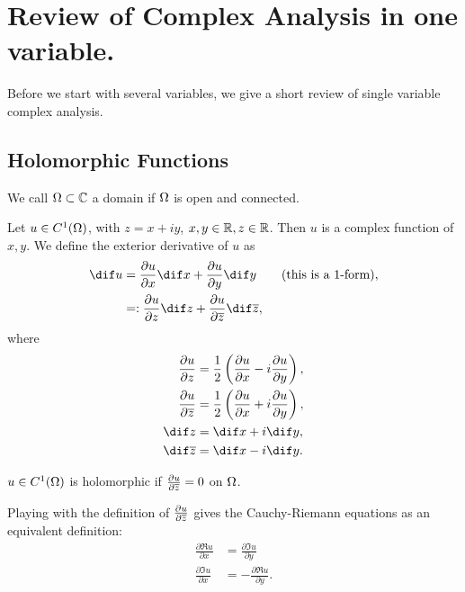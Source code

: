 \newpage
\section{Review of Complex Analysis in one variable.}

Before we start with several variables, we give a short review of single variable complex analysis.

\subsection{Holomorphic Functions}

\begin{definition}
    We call $\Omega \subset \mathbb{C}$ a domain if $\Omega$ is open and connected.
\end{definition}

\begin{definition}
    Let $u \in C^1 ( \Omega)$, with $z = x + i y$, $x,y \in \mathbb{R}, z \in \mathbb{R}$. Then $u $ is a complex function of $x ,y$. We define the exterior derivative of $u$ as
    \begin{align*}
        \dif u &= \frac{\partial u }{\partial x } \dif x + \frac{\partial u}{\partial y} \dif y \qquad \text{(this is a 1-form)}, \\
        &=: \frac{\partial u}{\partial z} \dif z + \frac{\partial u}{ \partial \ov{z} } \dif \ov{z},
    \end{align*}
    where
    \begin{align*}
        \frac{\partial u}{\partial z} &= \frac{1}{2} \br{\frac{\partial u}{\partial x} - i \frac{\partial u}{\partial y}},\\
        \frac{\partial u}{\partial \ov{z}} &= \frac{1}{2} \br{\frac{\partial u}{\partial x} + i \frac{\partial u}{\partial y}},\\
        \dif z &= \dif x + i \dif y,\\
        \dif \ov{z} &= \dif x - i \dif y.
    \end{align*}
\end{definition}

\begin{definition}
    $u \in C^1 (\Omega )$ is holomorphic if $\frac{\partial u}{\partial \overline{z}} = 0 $ on $\Omega$.
\end{definition}

\begin{note}
    Playing with the definition of $\frac{\partial u}{\partial \overline{z}}$ gives the Cauchy-Riemann equations as an equivalent definition:
    \begin{align*}
        \frac{\partial \Re u}{\partial x } &= \frac{\partial \Im u}{\partial y}\\
        \frac{\partial \Im u}{\partial x } &= -\frac{\partial \Re u}{\partial y}.
    \end{align*}
\end{note}

